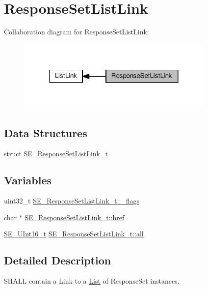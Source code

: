 \hypertarget{group__ResponseSetListLink}{}\section{Response\+Set\+List\+Link}
\label{group__ResponseSetListLink}
Collaboration diagram for Response\+Set\+List\+Link\+:\nopagebreak
\begin{figure}[H]
\begin{center}
\leavevmode
\includegraphics[width=276pt]{group__ResponseSetListLink}
\end{center}
\end{figure}
\subsection*{Data Structures}
\begin{DoxyCompactItemize}
\item 
struct \hyperlink{structSE__ResponseSetListLink__t}{S\+E\+\_\+\+Response\+Set\+List\+Link\+\_\+t}
\end{DoxyCompactItemize}
\subsection*{Variables}
\begin{DoxyCompactItemize}
\item 
uint32\+\_\+t \hyperlink{group__ResponseSetListLink_gac0a7f9313464899bf0f7ce52ebccb127}{S\+E\+\_\+\+Response\+Set\+List\+Link\+\_\+t\+::\+\_\+flags}
\item 
char $\ast$ \hyperlink{group__ResponseSetListLink_ga03c5ac2bc319d804b19972bf181a7ffb}{S\+E\+\_\+\+Response\+Set\+List\+Link\+\_\+t\+::href}
\item 
\hyperlink{group__UInt16_gac68d541f189538bfd30cfaa712d20d29}{S\+E\+\_\+\+U\+Int16\+\_\+t} \hyperlink{group__ResponseSetListLink_ga7803a9cad6f20a2c92bd6fb19237adb9}{S\+E\+\_\+\+Response\+Set\+List\+Link\+\_\+t\+::all}
\end{DoxyCompactItemize}


\subsection{Detailed Description}
S\+H\+A\+LL contain a Link to a \hyperlink{structList}{List} of Response\+Set instances. 

